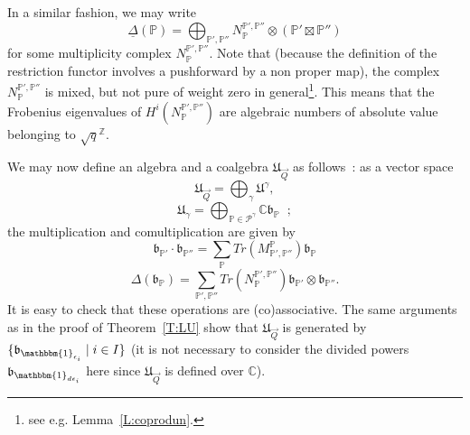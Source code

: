 \documentclass[a4paper,10pt]{amsart}
\def\Z{\mathbb{Z}}
\def\C{\mathbb{C}}
\def\bo{\mathfrak{b}}
\numberwithin{equation}{section}
\begin{document}
In a similar fashion, we may write
$$\underline{\Delta}(\mathbb{P})=\bigoplus_{\mathbb{P}', \mathbb{P}''}  N^{\mathbb{P}', \mathbb{P}''}_{\mathbb{P}} \otimes (\mathbb{P}' \boxtimes \mathbb{P}'')$$
for some multiplicity complex $N^{\mathbb{P}', \mathbb{P}''}_{\mathbb{P}}$. Note that (because the definition of the restriction functor involves a pushforward by a non proper map), the complex $N^{\mathbb{P}', \mathbb{P}''}_{\mathbb{P}}$ is mixed, but not pure of weight zero in general\footnote{see e.g. Lemma~\ref{L:coprodun}.}. This means that the Frobenius eigenvalues of $H^i(N^{\mathbb{P}',\mathbb{P}''}_{\mathbb{P}})$ are algebraic numbers of absolute value belonging to $\sqrt{q}^{\Z}$.

\vspace{.1in}

We may now define an algebra and a coalgebra $\mathfrak{U}_{\vec{Q}}$ as follows~: as a vector space
$$\mathfrak{U}_{\vec{Q}}=\bigoplus_{\gamma} \mathfrak{U}^{\gamma}, $$
$$\mathfrak{U}_{\gamma}=\bigoplus_{\mathbb{P} \in \mathcal{P}^{\gamma}} \C \bo_{\mathbb{P}}\;\;;$$
the multiplication and comultiplication are given by
$$\bo_{\mathbb{P}'} \cdot \bo_{\mathbb{P}''}=\sum_{\mathbb{P}} Tr(M_{\mathbb{P}', \mathbb{P}''}^{\mathbb{P}}) \bo_{\mathbb{P}}$$
$$\Delta(\bo_{\mathbb{P}})=\sum_{\mathbb{P}',\mathbb{P}''} Tr(N^{\mathbb{P}', \mathbb{P}''}_{\mathbb{P}}) \bo_{\mathbb{P}'} \otimes \bo_{\mathbb{P}''}.$$
It is easy to check that these operations are (co)associative. The same arguments as in the proof of Theorem~\ref{T:LU} show that $\mathfrak{U}_{\vec{Q}}$ is generated by $\{\bo_{\mathbbm{1}_{\epsilon_i}}\;|\; i \in I\}$ (it is not necessary to consider the divided powers $\bo_{\mathbbm{1}_{d\epsilon_i}}$ here since $\mathfrak{U}_{\vec{Q}}$ is defined over $\C$).

\vspace{.1in}
\end{document}
